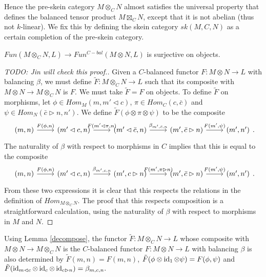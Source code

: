 \begin{remark}
  Hence the pre-skein category $M \otimes_{C} N$ almost satisfies the universal property that defines the balanced tensor product $M \boxtimes_{C} N$, except that it is not abelian (thus not $k$-linear). We fix this by defining the skein category $sk(M,C,N)$ as a certain completion of the pre-skein category.
\end{remark}

\begin{lemma}\label{surjective}
  $Fun(M\otimes_C N,L)\to Fun^{C-bal}(M\otimes N,L)$ is surjective on
  objects.
\end{lemma}

\begin{proof}
  [TODO: Jin will check this proof.]
  Given a $C$-balanced functor $F:M\otimes N \to L$ with balancing $\beta$, we
  must define $\tilde{F}:M\otimes_C N \to L$ such that its composite with
  $M\otimes N\to M\otimes_C N$ is $F$. We must take $\tilde{F}=F$ on objects.
  To define $\tilde{F}$ on morphisms, let $\phi\in Hom_M(m,m'\lhd c)$,
  $\pi\in Hom_C(c,\bar{c})$ and $\psi\in Hom_N(\bar{c}\rhd n,n')$. We define
  $\tilde{F}(\phi\otimes\pi\otimes\psi)$ to be the composite
  \[
    \begin{tikzcd}
      {(m,n)} & {(m'\lhd c,n)} & {(m'\lhd \bar{c},n)} & {(m',\bar{c}\rhd n)} & {(m',n')}
      \arrow["{F(\phi,n)}", from=1-1, to=1-2]
      \arrow["{F(m'\lhd\pi,n)}", from=1-2, to=1-3]
      \arrow["{\beta_{m',\bar{c},n}}", from=1-3, to=1-4]
      \arrow["{F(m',\psi)}", from=1-4, to=1-5]
    \end{tikzcd}.
  \]
  The naturality of $\beta$ with respect to morphisms in $C$ implies that this
  is equal to the composite
  \[
    \begin{tikzcd}
      {(m,n)} & {(m'\lhd c,n)} & {(m', c\rhd n)} & {(m',\bar{c}\rhd n)} & {(m',n')}
      \arrow["{F(\phi,n)}", from=1-1, to=1-2]
      \arrow["{\beta_{m',c,n}}", from=1-2, to=1-3]
      \arrow["{F(m',\pi\rhd n)}", from=1-3, to=1-4]
      \arrow["{F(m',\psi)}", from=1-4, to=1-5]
    \end{tikzcd}.
  \]
  From these two expressions it is clear that this respects the relations in
  the definition of $Hom_{M\otimes_C N}$. The proof that this respects
  composition is a straightforward calculation, using the naturality of
  $\beta$ with respect to morphisms in $M$ and $N$.
  \end{proof}

  \begin{remark}
    Using Lemma \ref{decompose}, the functor $\tilde{F}:M\otimes_C N\to L$
    whose composite with $M\otimes N\to M\otimes_C N$ is the $C$-balanced
    functor $F:M\otimes N\to L$ with balancing $\beta$ is also determined by
    $\tilde{F}(m,n)=F(m,n)$,
    $\tilde{F}(\phi\otimes\operatorname{id}_1\otimes\psi)=F(\phi,\psi)$ and
    $\tilde{F}(\operatorname{id}_{m\lhd c}\otimes\operatorname{id}_c\otimes\operatorname{id}_{c\rhd n})=\beta_{m,c,n}.$
  \end{remark}

